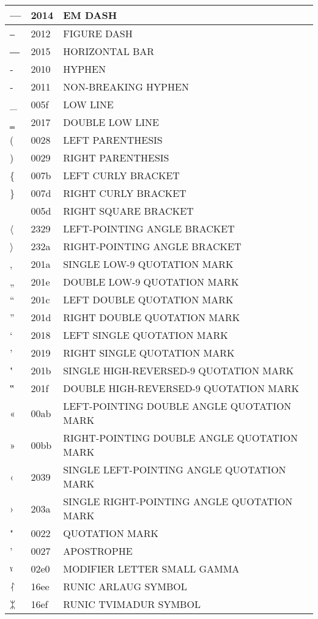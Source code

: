 \documentclass[12pt,letterpaper,openany]{book}
\begin{document}
\begin{center}
\begin{supertabular}{|m{0.25in}|m{0.5in}|m{4in}|}
— & 2014 & EM DASH\\\hline
‒ & 2012 & FIGURE DASH\\\hline
― & 2015 & HORIZONTAL BAR\\\hline
‐ & 2010 & HYPHEN\\\hline
‑ & 2011 & NON-BREAKING HYPHEN\\\hline
\_ & 005f & LOW LINE\\\hline
‗ & 2017 & DOUBLE LOW LINE\\\hline
( & 0028 & LEFT PARENTHESIS\\\hline
) & 0029 & RIGHT PARENTHESIS\\\hline
\{ & 007b & LEFT CURLY BRACKET\\\hline
\} & 007d & RIGHT CURLY BRACKET\\ & 005d & RIGHT SQUARE BRACKET\\\hline
〈 & 2329 & LEFT-POINTING ANGLE BRACKET\\\hline
〉 & 232a & RIGHT-POINTING ANGLE BRACKET\\\hline
‚ & 201a & SINGLE LOW-9 QUOTATION MARK\\\hline
„ & 201e & DOUBLE LOW-9 QUOTATION MARK\\\hline
“ & 201c & LEFT DOUBLE QUOTATION MARK\\\hline
” & 201d & RIGHT DOUBLE QUOTATION MARK\\\hline
‘ & 2018 & LEFT SINGLE QUOTATION MARK\\\hline
’ & 2019 & RIGHT SINGLE QUOTATION MARK\\\hline
‛ & 201b & SINGLE HIGH-REVERSED-9 QUOTATION MARK\\\hline
‟ & 201f & DOUBLE HIGH-REVERSED-9 QUOTATION MARK\\\hline
« & 00ab & LEFT-POINTING DOUBLE ANGLE QUOTATION MARK\\\hline
» & 00bb & RIGHT-POINTING DOUBLE ANGLE QUOTATION MARK\\\hline
‹ & 2039 & SINGLE LEFT-POINTING ANGLE QUOTATION MARK\\\hline
› & 203a & SINGLE RIGHT-POINTING ANGLE QUOTATION MARK\\\hline
" & 0022 & QUOTATION MARK\\\hline
' & 0027 & APOSTROPHE\\\hline
ˠ & 02e0 & MODIFIER LETTER SMALL GAMMA\\\hline
ᛮ & 16ee & RUNIC ARLAUG SYMBOL\\\hline
ᛯ & 16ef & RUNIC TVIMADUR SYMBOL\\\hline

\end{supertabular}
\end{center}
\end{document}
